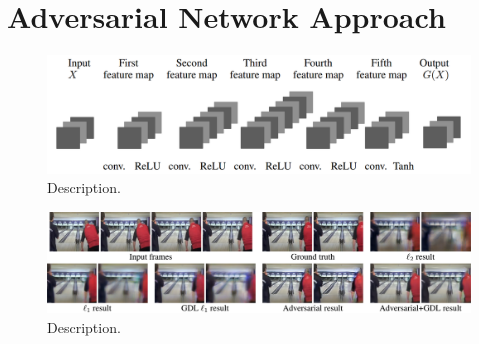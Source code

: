 \section{Adversarial Network Approach}


\begin{figure}[htb]
	\centering
	\includegraphics[width=0.8\linewidth]{figures/related/deep_multiscale_generator.png} 
	\caption[Short]{Description.} \label{fig:gan_generator}
\end{figure}


\begin{figure}[htb]
	\centering
	\includegraphics[width=1.0\linewidth]{figures/related/deep_multiscale_samples.png} 
	\caption[Short]{Description.} \label{fig:gan_samples}
\end{figure}





